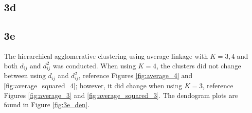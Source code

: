 \documentclass[12pt]{article}
\begin{document}
\subsection*{3d}

\subsection*{3e}

The hierarchical agglomerative clustering using average linkage with $K=3,4$ and both $d_{ij}$ and $d_{ij}^2$ was conducted. When using $K=4$, the clusters did not change between using $d_{ij}$ and $d_{ij}^2$, reference Figures \ref{fig:average_4} and \ref{fig:average_squared_4}; however, it did change when using $K=3$, reference Figures \ref{fig:average_3} and \ref{fig:average_squared_3}. The dendogram plots are found in Figure \ref{fig:3e_den}.
\end{document}
